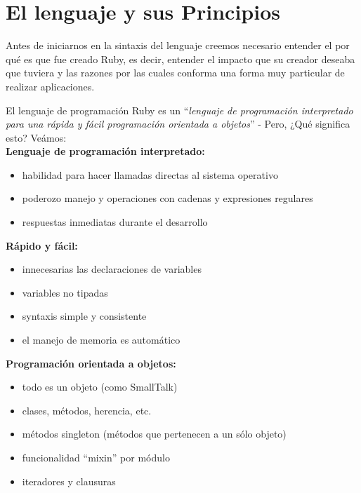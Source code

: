 \documentclass{article}
\begin{document}
\section{El lenguaje y sus Principios}
	
	Antes de iniciarnos en la sintaxis del lenguaje creemos necesario entender el por qué es que fue creado Ruby, es decir, entender el impacto que su creador deseaba que tuviera y las razones por las cuales conforma una forma muy particular de realizar aplicaciones.
	\par
	El lenguaje de programación Ruby es un ``\emph{lenguaje de programación interpretado para una rápida y fácil programación orientada a objetos}'' - Pero, ¿Qué significa esto? Veámos:
\bigskip\\

\textbf{Lenguaje de programación interpretado:}
\begin{itemize}
	\itemsep=1pt \topsep=0pt \partopsep=0pt \parskip=0pt \parsep=0pt
	\item habilidad para hacer llamadas directas al sistema operativo
	\item poderozo manejo y operaciones con cadenas y expresiones regulares
	\item respuestas inmediatas durante el desarrollo
\end{itemize}
\medskip

\textbf{Rápido y fácil:}
\begin{itemize}
\itemsep=2pt \topsep=0pt \partopsep=0pt \parskip=0pt \parsep=0pt
	\item innecesarias las declaraciones de variables
	\item variables no tipadas
	\item syntaxis simple y consistente
	\item el manejo de memoria es automático
\end{itemize}
\medskip

\textbf{Programación orientada a objetos:}
\begin{itemize}
\itemsep=2pt \topsep=0pt \partopsep=0pt \parskip=0pt \parsep=0pt
	\item todo es un objeto (como SmallTalk)
	\item clases, métodos, herencia, etc.
	\item métodos singleton (métodos que pertenecen a un sólo objeto)
	\item funcionalidad ``mixin'' por módulo
	\item iteradores y clausuras
\end{itemize}
\medskip
\end{document}
